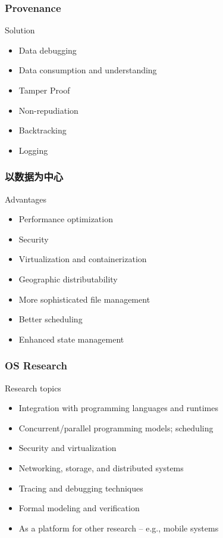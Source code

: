 \begin{frame}
\frametitle{Provenance}
\begin{block}{Solution}
\begin{itemize}
	\item Data debugging
	\item Data consumption and understanding
	\item Tamper Proof
	\item Non-repudiation
	\item Backtracking 
	\item Logging
\end{itemize} 
\end{block}
\end{frame}




\begin{frame}
\frametitle{以数据为中心}
\begin{block}{Advantages}
\begin{itemize}
	\item Performance optimization
	\item Security
	\item Virtualization and containerization
	\item Geographic distributability
	\item More sophisticated file management
	\item Better scheduling
	\item Enhanced state management
\end{itemize} 
\end{block}
\end{frame}









\begin{frame}
\frametitle{OS Research}
\begin{block}{Research topics}
\begin{itemize}
	\item Integration with programming languages and runtimes
	\item Concurrent/parallel programming models; scheduling
	\item Security and virtualization
	\item Networking, storage, and distributed systems
	\item Tracing and debugging techniques
	\item Formal modeling and verification
	\item As a platform for other research – e.g., mobile systems
\end{itemize} 
\end{block}
\end{frame}











